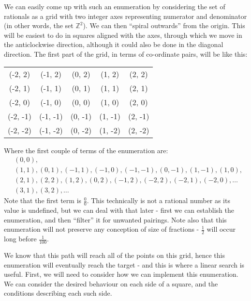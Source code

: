 \documentclass[fleqn,a4paper,11pt]{article}
\begin{document}
    We can easily come up with such an enumeration by considering the set of
    rationals as a grid with two integer axes representing numerator and
    denominator (in other words, the set \(\mathbb{Z}^2\)). We can then ``spiral
    outwards'' from the origin. This will be easiest to do in squares aligned
    with the axes, through which we move in the anticlockwise direction,
    although it could also be done in the diagonal direction.  The first part of
    the grid, in terms of co-ordinate pairs, will be like this:
    \begin{center}
        \begin{tabular}{ c c c c c }
            (-2, 2) & (-1, 2) & (0, 2) & (1, 2) & (2, 2) \\
            (-2, 1) & (-1, 1) & (0, 1) & (1, 1) & (2, 1) \\
            (-2, 0) & (-1, 0) & (0, 0) & (1, 0) & (2, 0) \\
            (-2, -1) & (-1, -1) & (0, -1) & (1, -1) & (2, -1) \\
            (-2, -2) & (-1, -2) & (0, -2) & (1, -2) & (2, -2) \\
        \end{tabular}
    \end{center}
    Where the first couple of terms of the enumeration are:
    \begin{equation}
        \begin{split}
        &(0, 0), \\
        &(1, 1), (0, 1), (-1, 1), (-1, 0), (-1, -1), (0, -1), (1, -1), (1, 0), \\
        &(2, 1), (2, 2), (1, 2), (0, 2), (-1, 2), (-2, 2), (-2, 1), (-2, 0), \ldots \\
        &(3, 1), (3, 2), \ldots
        \end{split}
    \end{equation}
    Note that the first term is \(\frac{0}{0}\). This technically is not a
    rational number as its value is undefined, but we can deal with that later
    - first we can establish the enumeration, and then ``filter'' it for
    unwanted pairings. Note also that this enumeration will not preserve any
    conception of size of fractions - \(\frac{1}{2}\) will occur long before
    \(\frac{1}{100}\).

    We know that this path will reach all of the points on this grid, hence this
    enumeration will eventually reach the target - and this is where a linear
    search is useful. First, we will need to consider how we can implement this
    enumeration. We can consider the desired behaviour on each side of a square,
    and the conditions describing each such side.
\end{document}
